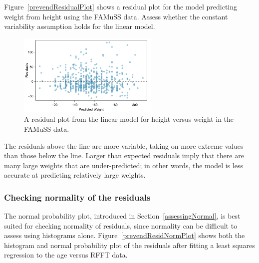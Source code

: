 \begin{example}{
Figure~\ref{prevendResidualPlot} shows a residual plot for the model predicting weight from height using the FAMuSS data. Assess whether the constant variability assumption holds for the linear model.
\begin{figure}[h!]
	\centering
	\includegraphics[width=0.6\textwidth]
	{ch_simple_linear_regression_oi_biostat/figures/famussHeightWeightResidualPlot/famussHeightWeightResidualPlot.pdf}
	\caption{A residual plot from the linear model for height versus weight in the FAMuSS data.}
	\label{famussHeightWeightResidualPlot}
	\end{figure}
}

The residuals above the line are more variable, taking on more extreme values than those below the line. Larger than expected residuals imply that there are many large weights that are under-predicted; in other words, the model is less accurate at predicting relatively large weights.
	
\end{example}



\subsubsection{Checking normality of the residuals}



The normal probability plot, introduced in Section~\ref{assessingNormal}, is best suited for checking normality of residuals, since normality can be difficult to assess using histograms alone. Figure~\ref{prevendResidNormPlot} shows both the histogram and normal probability plot of the residuals after fitting a least squares regression to the age versus RFFT data.  
 
